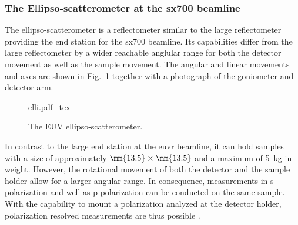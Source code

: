 \subsubsection{The Ellipso-scatterometer at the \gls{sx700} beamline}
The ellipso-scatterometer is a reflectometer similar to the large reflectometer providing the end station for the \gls{sx700} beamline. Its capabilities differ from the large reflectometer by a wider reachable anglular range for both the detector movement as well as the sample movement. The angular and linear movements and axes are shown in Fig.~\ref{ch_exp:fig_elli} together with a photograph of the goniometer and detector arm.
\begin{figure}[htb]
    \def\svgwidth{\textwidth}
    {elli.pdf_tex}
    \caption[The EUV ellipso-scatterometer.]{The EUV ellipso-scatterometer.}
    \label{ch_exp:fig_elli}
\end{figure}
In contrast to the large end station at the \gls{euvr} beamline, it can hold samples with a size of approximately $\mm{13.5} \times \mm{13.5}$  and a maximum of \SI{5}{\kg} in weight. However, the rotational movement of both the detector and the sample holder allow for a larger angular range. In consequence, measurements in s-polarization and well as p-polarization can be conducted on the same sample. With the capability to mount a polarization analyzed at the detector holder, polarization resolved measurements are thus possible \cite{soltwisch_polarization_2015}.

